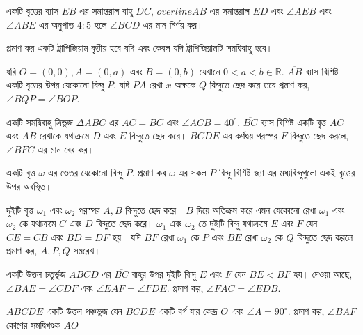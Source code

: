 \documentclass[a4paper,11pt]{article}
\newcommand{\drg}{^{\circ}}
\begin{document}
\begin{Exercise}
	\begin{prob}[AMC 10B 2011/17]
		একটি বৃত্তের ব্যাস $\overline{EB}$ এর সমান্তরাল বাহু $\overline{DC}$, $overline{AB}$ এর সমান্তরাল $\overline{ED}$ এবং $\angle AEB$ এবং $\angle ABE$ এর অনুপাত $4:5$ হলে $\angle BCD$ এর মান নির্ণয় কর। 
		\begin{center}
		\end{center}
	\end{prob}
	\begin{prob}
		প্রমাণ কর একটি ট্রাপিজিয়াম বৃত্তীয় হবে যদি এবং কেবল যদি ট্রাপিজিয়ামটি সমদ্বিবাহু হবে।
	\end{prob}
	\begin{prob}[BAMO 1999/2]
		ধরি $O=(0,0), A=(0,a)$ এবং $B=(0,b)$ যেখানে $0<a<b \in \mathbb{R}$. $\overline{AB}$ ব্যাস বিশিষ্ট একটি বৃত্তের উপর যেকোনো বিন্দু $P$. যদি $PA$ রেখা $x$-অক্ষকে $Q$ বিন্দুতে ছেদ করে তবে প্রমাণ কর, $\angle BQP=\angle BOP$.
	\end{prob}
	\begin{prob}[AMC 10A 2019/13]
		একটি সমদ্বিবাহু ত্রিভুজ $\Delta ABC$ এর $AC=BC$ এবং $\angle ACB=40\drg$. $\overline{BC}$ ব্যাস বিশিষ্ট একটি বৃত্ত $AC$ এবং $AB$ রেখাকে যথাক্রমে $D$ এবং $E$ বিন্দুতে ছেদ করে। $BCDE$ এর কর্ণদ্বয় পরস্পর $F$ বিন্দুতে ছেদ করলে, $\angle BFC$ এর মান বের কর।
	\end{prob}
	\begin{prob}[Canada 1991/3]
		একটি বৃত্ত $\omega$ এর ভেতর যেকোনো বিন্দু $P$. প্রমাণ কর $\omega$ এর সকল $P$ বিন্দু বিশিষ্ট জ্যা এর মধ্যবিন্দুগুলো একই বৃত্তের উপর অবস্থিত।
	\end{prob}
	\begin{prob}
		দুইটি বৃত্ত $\omega_1$ এবং $\omega_2$ পরস্পর $A,B$ বিন্দুতে ছেদ করে। $B$ দিয়ে অতিক্রম করে এমন যেকোনো রেখা $\omega_1$ এবং $\omega_2$ কে যথাক্রমে $C$ এবং $D$ বিন্দুতে ছেদ করে। $\omega_1$ এবং $\omega_2$ তে দুইটি বিন্দু যথাক্রমে $E$ এবং $F$ যেন $CE=CB$ এবং $BD=DF$ হয়। যদি $BF$ রেখা $\omega_1$ কে $P$ এবং $BE$ রেখা $\omega_2$ কে $Q$ বিন্দুতে ছেদ করলে প্রমাণ কর, $A,P,Q$ সমরেখ।
	\end{prob}
	\begin{prob}[Russia 1996]
		একটি উত্তল চতুর্ভুজ $ABCD$ এর $\overline{BC}$ বাহুর উপর দুইটি বিন্দু $E$ এবং $F$ যেন $BE<BF$ হয়। দেওয়া আছে, $\angle BAE=\angle CDF$ এবং $\angle EAF=\angle FDE$. প্রমাণ কর, $\angle FAC=\angle EDB$.
	\end{prob}
	\begin{prob}
		$ABCDE$ একটি উত্তল পঞ্চভুজ যেন $BCDE$ একটি বর্গ যার কেন্দ্র $O$ এবং $\angle A=90\drg$. প্রমাণ কর, $\angle BAF$ কোণের সমদ্বিখণ্ডক $\overline{AO}$
	\end{prob}
\end{Exercise}
\newpage
\end{document}
